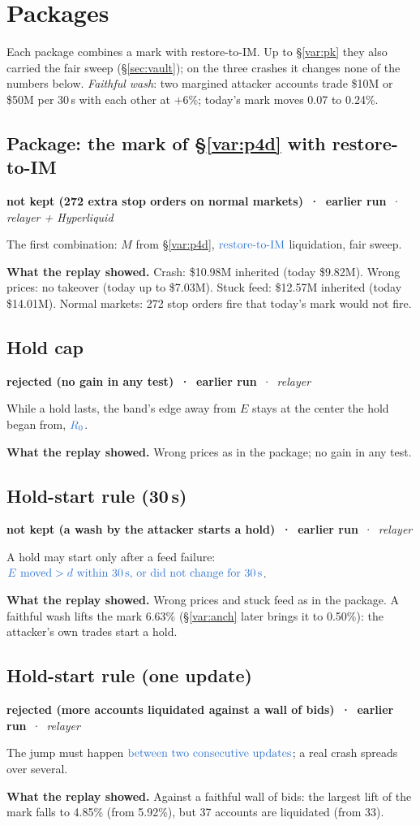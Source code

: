 \documentclass[10.5pt,a4paper]{article}
\newcommand{\chg}[1]{\ensuremath{{\color[HTML]{2F74D0}#1}}}
\newcommand{\st}[3]{\textcolor{#1}{\textbf{#2}} \,·\, \emph{#3}\par}
\newcommand{\res}[1]{\par\textbf{What the replay showed.} #1\par}
\begin{document}
\section{Packages}\label{sec:pkg}
Each package combines a mark with restore-to-IM. Up to \S\ref{var:pk} they also carried the fair sweep (\S\ref{sec:vault}); on the three crashes it changes none of the numbers below. \emph{Faithful wash}: two margined attacker accounts trade \$10M or \$50M per 30\,s with each other at $+6\%$; today's mark moves 0.07 to 0.24\%.

\subsection{Package: the mark of \S\ref{var:p4d} with restore-to-IM}\label{var:auto16}
\st{sup}{not kept (272 extra stop orders on normal markets) \,·\, earlier run}{relayer + Hyperliquid}
The first combination: $M$ from \S\ref{var:p4d}, \chg{\text{restore-to-IM}} liquidation, fair sweep.
\res{Crash: \$10.98M inherited (today \$9.82M). Wrong prices: no takeover (today up to \$7.03M). Stuck feed: \$12.57M inherited (today \$14.01M). Normal markets: 272 stop orders fire that today's mark would not fire.}

\subsection{Hold cap}\label{var:auto17}
\st{rej}{rejected (no gain in any test) \,·\, earlier run}{relayer}
While a hold lasts, the band's edge away from $E$ stays at the center the hold began from, $\chg{R_0}$.
\res{Wrong prices as in the package; no gain in any test.}

\subsection{Hold-start rule (30\,s)}\label{var:auto18}
\st{sup}{not kept (a wash by the attacker starts a hold) \,·\, earlier run}{relayer}
A hold may start only after a feed failure: $\chg{E \text{ moved} > d \text{ within } 30\,\text{s, or did not change for } 30\,\text{s}}$.
\res{Wrong prices and stuck feed as in the package. A faithful wash lifts the mark 6.63\% (\S\ref{var:anch} later brings it to 0.50\%): the attacker's own trades start a hold.}

\subsection{Hold-start rule (one update)}\label{var:auto19}
\st{rej}{rejected (more accounts liquidated against a wall of bids) \,·\, earlier run}{relayer}
The jump must happen $\chg{\text{between two consecutive updates}}$; a real crash spreads over several.
\res{Against a faithful wall of bids: the largest lift of the mark falls to 4.85\% (from 5.92\%), but 37 accounts are liquidated (from 33).}
\end{document}
